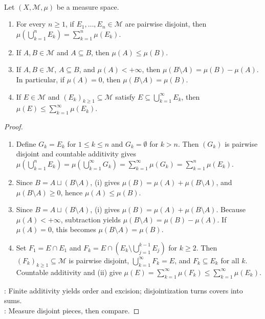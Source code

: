 \begin{proposition} \label{prop:measure-basic-laws} \\
Let $(X,\mathcal{M},\mu)$ be a measure space.
\begin{enumerate}[label=(\roman*)]
\setlength{\itemsep}{0pt}
\item For every $n\geq1$, if $E_1,\ldots,E_n\in\mathcal{M}$ are pairwise disjoint, then $\mu\left(\bigcup\limits_{k=1}^{n}E_k\right)=\sum\limits_{k=1}^{n}\mu(E_k)$.
\item If $A,B\in\mathcal{M}$ and $A\subseteq B$, then $\mu(A)\leq\mu(B)$.
\item If $A,B\in\mathcal{M}$, $A\subseteq B$, and $\mu(A)<+\infty$, then $\mu(B\setminus A)=\mu(B)-\mu(A)$.\\
In particular, if $\mu(A)=0$, then $\mu(B\setminus A)=\mu(B)$.
\item If $E\in\mathcal{M}$ and $(E_k)_{k\geq1}\subseteq\mathcal{M}$ satisfy $E\subseteq\bigcup\limits_{k=1}^{\infty}E_k$, then $\mu(E)\leq\sum\limits_{k=1}^{\infty}\mu(E_k)$.
\end{enumerate}
\begin{proof}
\begin{enumerate}[label=(\roman*)]
\setlength{\itemsep}{0pt}
\item Define $G_k=E_k$ for $1\leq k\leq n$ and $G_k=\emptyset$ for $k>n$. Then $(G_k)$ is pairwise disjoint and countable additivity gives $\mu\left(\bigcup\limits_{k=1}^{n}E_k\right)=\mu\left(\bigcup\limits_{k=1}^{\infty}G_k\right)=\sum\limits_{k=1}^{\infty}\mu(G_k)=\sum\limits_{k=1}^{n}\mu(E_k)$.
\item Since $B=A\sqcup(B\setminus A)$, (i) gives $\mu(B)=\mu(A)+\mu(B\setminus A)$, and $\mu(B\setminus A)\geq0$, hence $\mu(A)\leq\mu(B)$.
\item Since $B=A\sqcup(B\setminus A)$, (i) gives $\mu(B)=\mu(A)+\mu(B\setminus A)$. Because $\mu(A)<+\infty$, subtraction yields $\mu(B\setminus A)=\mu(B)-\mu(A)$. If $\mu(A)=0$, this becomes $\mu(B\setminus A)=\mu(B)$.
\item Set $F_1=E\cap E_1$ and $F_k=E\cap\left(E_k\setminus\bigcup\limits_{j=1}^{k-1}E_j\right)$ for $k\geq2$. Then $(F_k)_{k\geq1}\subseteq\mathcal{M}$ is pairwise disjoint, $\bigcup\limits_{k=1}^{\infty}F_k=E$, and $F_k\subseteq E_k$ for all $k$. Countable additivity and (ii) give $\mu(E)=\sum\limits_{k=1}^{\infty}\mu(F_k)\leq\sum\limits_{k=1}^{\infty}\mu(E_k)$.
\end{enumerate}
: Finite additivity yields order and excision; disjointization turns covers into sums.\\
: Measure disjoint pieces, then compare.
\end{proof}
\end{proposition}


